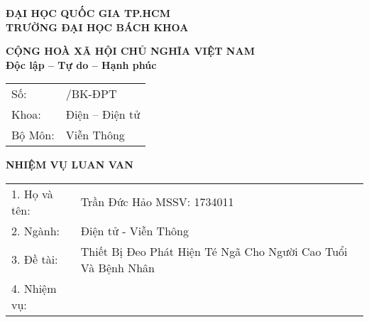 \thispagestyle{empty}


\noindent
\begin{minipage}[t]{0.48\textwidth}
    \centering
    \textbf{ĐẠI HỌC QUỐC GIA TP.HCM} \\
    \textbf{TRƯỜNG ĐẠI HỌC BÁCH KHOA} \\
\end{minipage}%
\hfill
\begin{minipage}[t]{0.48\textwidth}
    \centering
    \textbf{CỘNG HOÀ XÃ HỘI CHỦ NGHĨA VIỆT NAM} \\
    \textbf{Độc lập -- Tự do -- Hạnh phúc} \\
\end{minipage}

\vspace{0.5em}

\noindent
\begin{tabular}{ll}
    Số: & \underline{\hspace{2cm}}/BK-ĐPT \\
    Khoa: & Điện -- Điện tử \\
    Bộ Môn: & Viễn Thông \\
\end{tabular}

\vspace{0.5em}

\begin{center}
    \textbf{\large NHIỆM VỤ LUAN VAN}
\end{center}

\vspace{0.5em}

\noindent
\begin{tabular}{ll}
    1. Họ và tên: & Trần Đức Hảo \hspace{2cm} MSSV: 1734011 \\
    2. Ngành: & Điện tử - Viễn Thông \\
    3. Đề tài: & Thiết Bị Đeo Phát Hiện Té Ngã Cho Người Cao Tuổi Và Bệnh Nhân \\
    4. Nhiệm vụ: \\
 
    
\end{tabular}

\vspace{0.5em}

